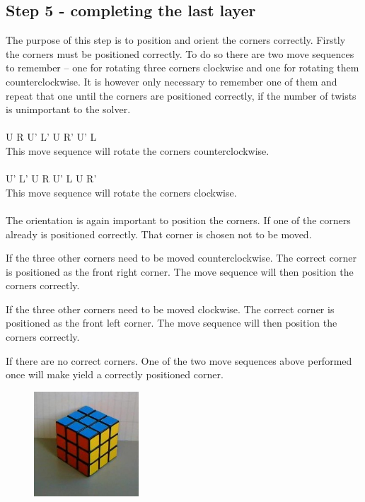\subsection{Step 5 - completing the last layer}
The purpose of this step is to position and orient the corners correctly. Firstly the corners must be positioned correctly. To do so there are two move sequences to remember -- one for rotating three corners clockwise and one for rotating them counterclockwise. It is however only necessary to remember one of them and repeat that one until the corners are positioned correctly, if the number of twists is unimportant to the solver. \\
\\
U R U' L' U R' U' L
\\
This move sequence will rotate the corners counterclockwise.
\\
\\
U' L' U R U' L U R'
\\
This move sequence will rotate the corners clockwise.
\\
\\
The orientation is again important to position the corners. If one of the corners already is positioned correctly. That corner is chosen not to be moved. 

If the three other corners need to be moved counterclockwise. The correct corner is positioned as the front right corner. The move sequence will then position the corners correctly.

If the three other corners need to be moved clockwise. The correct corner is positioned as the front left corner. The move sequence will then position the corners correctly.

If there are no correct corners. One of the two move sequences above performed once will make yield a correctly positioned corner.

\begin{figure}
\begin{center}
	\includegraphics[width=0.35\textwidth]{input/pics/8done.jpg}	
\end{center}
\caption{}
\label{fig:8done}
\end{figure}

